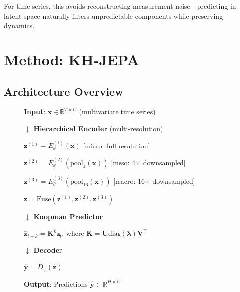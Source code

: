 \documentclass{article}
\begin{document}
For time series, this avoids reconstructing measurement noise—predicting in latent space naturally filters unpredictable components while preserving dynamics.

\section{Method: KH-JEPA}

\subsection{Architecture Overview}

\begin{figure}[h]
\centering
\begin{tcolorbox}[colback=blue!5,colframe=blue!40!black,title=KH-JEPA Architecture]
\textbf{Input}: $\mathbf{x} \in \mathbb{R}^{T \times C}$ (multivariate time series)

\vspace{0.5em}
$\downarrow$ \textbf{Hierarchical Encoder} (multi-resolution)

\vspace{0.3em}
$\mathbf{z}^{(1)} = E_\theta^{(1)}(\mathbf{x})$ \hfill [micro: full resolution]

$\mathbf{z}^{(2)} = E_\theta^{(2)}(\text{pool}_4(\mathbf{x}))$ \hfill [meso: 4$\times$ downsampled]

$\mathbf{z}^{(3)} = E_\theta^{(3)}(\text{pool}_{16}(\mathbf{x}))$ \hfill [macro: 16$\times$ downsampled]

$\mathbf{z} = \text{Fuse}(\mathbf{z}^{(1)}, \mathbf{z}^{(2)}, \mathbf{z}^{(3)})$

\vspace{0.5em}
$\downarrow$ \textbf{Koopman Predictor}

\vspace{0.3em}
$\hat{\mathbf{z}}_{t+k} = \mathbf{K}^k \mathbf{z}_t$, where $\mathbf{K} = \mathbf{U} \text{diag}(\boldsymbol{\lambda}) \mathbf{V}^\top$

\vspace{0.5em}
$\downarrow$ \textbf{Decoder}

\vspace{0.3em}
$\hat{\mathbf{y}} = D_\psi(\hat{\mathbf{z}})$

\vspace{0.5em}
\textbf{Output}: Predictions $\hat{\mathbf{y}} \in \mathbb{R}^{H \times C}$
\end{tcolorbox}
\end{figure}
\end{document}
